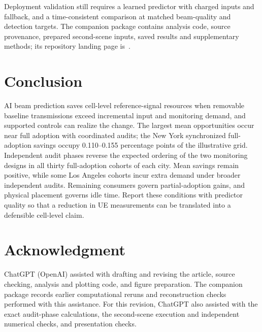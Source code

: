 \documentclass[journal,10pt]{IEEEtran}
\begin{document}
Deployment validation still requires a learned predictor with charged inputs and fallback, and a time-consistent comparison at matched beam-quality and detection targets. The companion package contains analysis code, source provenance, prepared second-scene inputs, saved results and supplementary methods; its repository landing page is~\cite{projectrepo}.

\section{Conclusion}
AI beam prediction saves cell-level reference-signal resources when removable baseline transmissions exceed incremental input and monitoring demand, and supported controls can realize the change. The largest mean opportunities occur near full adoption with coordinated audits; the New York synchronized full-adoption savings occupy 0.110--0.155 percentage points of the illustrative grid. Independent audit phases reverse the expected ordering of the two monitoring designs in all thirty full-adoption cohorts of each city. Mean savings remain positive, while some Los Angeles cohorts incur extra demand under broader independent audits. Remaining consumers govern partial-adoption gains, and physical placement governs idle time. Report these conditions with predictor quality so that a reduction in UE measurements can be translated into a defensible cell-level claim.

\section*{Acknowledgment}
ChatGPT (OpenAI) assisted with drafting and revising the article, source checking, analysis and plotting code, and figure preparation. The companion package records earlier computational reruns and reconstruction checks performed with this assistance. For this revision, ChatGPT also assisted with the exact audit-phase calculations, the second-scene execution and independent numerical checks, and presentation checks.
\end{document}

